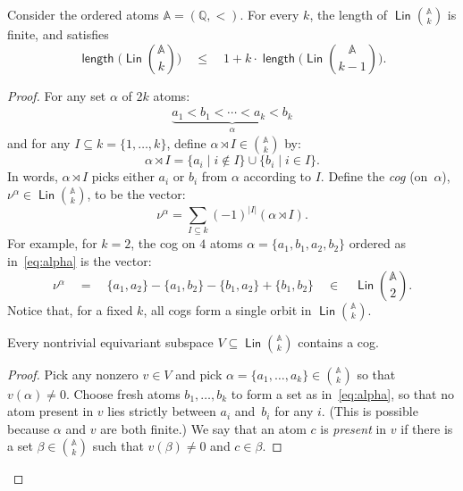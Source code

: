 \documentclass[10pt,a4paper]{amsart}
\numberwithin{equation}{section}
\newcommand{\Rat}{{\mathbb Q}}
\newcommand{\atoms}{\mathbb A}
\DeclareMathOperator{\lin}{\mathsf{Lin}}
\DeclareMathOperator{\length}{\mathsf{length}}
\begin{document}
\begin{lemma}\label{lem:ordered-length-1o}
Consider the ordered atoms $\atoms=(\Rat,<)$. For every $k$, the length of $\lin{\atoms\choose k}$ is finite, and satisfies
\[
	\textstyle \length\big(\lin{\atoms\choose k}\big)
	\quad \leq \quad  1+k\cdot\length\big(\lin{\atoms\choose k-1}\big).
\] 
\end{lemma}
\begin{proof}
For any set $\alpha$ of $2k$ atoms:
\begin{align}\label{eq:alpha}
	\underbrace{a_1<b_1<\cdots<a_k<b_k}_\alpha
\end{align}
and for any $I\subseteq k = \{1,\ldots,k\}$, define $\alpha\rtimes I \in {\atoms\choose k}$ by:
\[
	\alpha\rtimes I = \{a_i \mid i\not\in I\}\cup \{b_i\mid i\in I\}.
\]
In words, $\alpha\rtimes I$ picks either $a_i$ or $b_i$ from $\alpha$ according to $I$.
Define the {\em cog} (on~$\alpha$), $\nu^\alpha\in \lin {\atoms\choose k}$, to be the vector:
\[
	\nu^\alpha = \sum_{I\subseteq k}(-1)^{|I|}(\alpha\rtimes I).
\]
For example, for $k=2$, the cog on $4$ atoms $\alpha=\{a_1,b_1,a_2,b_2\}$ ordered as in~\eqref{eq:alpha} is the vector:
\[
	\textstyle \nu^\alpha \quad=\quad \{a_1,a_2\}-\{a_1,b_2\}-\{b_1,a_2\}+\{b_1,b_2\} \quad\in\quad \lin{\atoms\choose 2}.
\]
Notice that, for a fixed $k$, all cogs form a single orbit in $\lin{\atoms\choose k}$.

\begin{claim}\label{clm:cogs-everywhere}
Every nontrivial equivariant subspace $V\subseteq \lin{\atoms\choose k}$ contains a cog.
\end{claim}
\begin{proof}
Pick any nonzero $v\in V$ and pick $\alpha=\{a_1,\ldots,a_k\}\in{\atoms\choose k}$ so that $v(\alpha)\neq 0$. Choose fresh atoms $b_1,\ldots,b_k$  to form a set as in~\eqref{eq:alpha}, so that no atom present in $v$ lies strictly between $a_i$ and~$b_i$ for any $i$. (This is possible because $\alpha$ and $v$ are both finite.) We say that an atom $c$ is {\em present} in $v$ if there is a set $\beta\in{\atoms\choose k}$ such that $v(\beta)\neq 0$ and $c\in\beta$.


\end{proof}
\end{proof}
\end{document}
